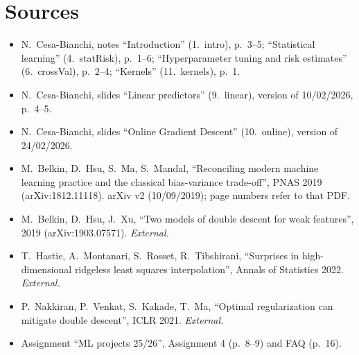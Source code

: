 \documentclass[11pt,a4paper]{article}
\begin{document}
\section{Sources}
\begin{itemize}
  \item N.\ Cesa-Bianchi, notes ``Introduction'' (1.\ intro), p.~3--5; ``Statistical learning'' (4.\ statRisk), p.~1--6;
        ``Hyperparameter tuning and risk estimates'' (6.\ crossVal), p.~2--4; ``Kernels'' (11.\ kernels), p.~1.
  \item N.\ Cesa-Bianchi, slides ``Linear predictors'' (9.\ linear), version of 10/02/2026, p.~4--5.
  \item N.\ Cesa-Bianchi, slides ``Online Gradient Descent'' (10.\ online), version of 24/02/2026.
  \item M.\ Belkin, D.\ Hsu, S.\ Ma, S.\ Mandal, ``Reconciling modern machine learning practice and the classical
        bias-variance trade-off'', PNAS 2019 (arXiv:1812.11118). arXiv v2 (10/09/2019); page numbers refer to that PDF.
  \item M.\ Belkin, D.\ Hsu, J.\ Xu, ``Two models of double descent for weak features'', 2019 (arXiv:1903.07571). \emph{External.}
  \item T.\ Hastie, A.\ Montanari, S.\ Rosset, R.\ Tibshirani, ``Surprises in high-dimensional ridgeless least squares
        interpolation'', Annals of Statistics 2022. \emph{External.}
  \item P.\ Nakkiran, P.\ Venkat, S.\ Kakade, T.\ Ma, ``Optimal regularization can mitigate double descent'', ICLR 2021. \emph{External.}
  \item Assignment ``ML projects 25/26'', Assignment 4 (p.~8--9) and FAQ (p.~16).
\end{itemize}
\end{document}
